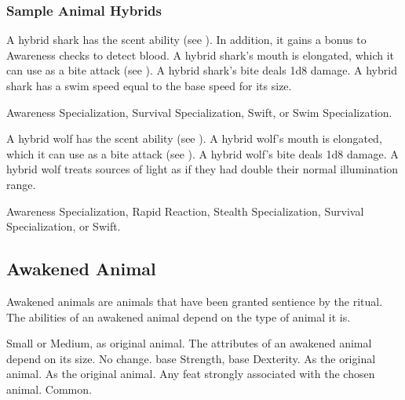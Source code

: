         \subsubsection{Sample Animal Hybrids}


            \begin{itemize}
                 A hybrid shark has the scent ability (see ).
                    In addition, it gains a  bonus to Awareness checks to detect blood.
                 A hybrid shark's mouth is elongated, which it can use as a bite attack (see ).
                    A hybrid shark's bite deals 1d8 damage.
                 A hybrid shark has a swim speed equal to the base speed for its size.
            \end{itemize}
             Awareness Specialization, Survival Specialization, Swift, or Swim Specialization.


            \begin{itemize}
                 A hybrid wolf has the scent ability (see ).
                 A hybrid wolf's mouth is elongated, which it can use as a bite attack (see ).
                    A hybrid wolf's bite deals 1d8 damage.
                 A hybrid wolf treats sources of light as if they had double their normal illumination range.
            \end{itemize}
             Awareness Specialization, Rapid Reaction, Stealth Specialization, Survival Specialization, or Swift.

    \subsection{Awakened Animal}

        Awakened animals are animals that have been granted sentience by the  ritual.
        The abilities of an awakened animal depend on the type of animal it is.

         Small or Medium, as original animal.
         The attributes of an awakened animal depend on its size.
         No change.
          base Strength,  base Dexterity.
         As the original animal.
         As the original animal.
         Any feat strongly associated with the chosen animal.
         Common.

